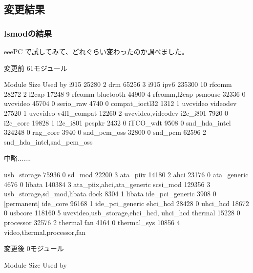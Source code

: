 \documentclass[mingoth,a4paper]{jsarticle}
\begin{document}
\subsection{変更結果}

\subsubsection{lsmodの結果}

eeePC で試してみて、どれぐらい変わったのか調べました。
\begin{multicols}{2}
 変更前 61モジュール
\begin{commandline}
Module                  Size  Used by
i915                   25280  2   
drm                    65256  3 i915
ipv6                  235300  10  
rfcomm                 28272  2   
l2cap                  17248  9 rfcomm
bluetooth              44900  4 rfcomm,l2cap
psmouse                32336  0   
uvcvideo               45704  0   
serio_raw               4740  0   
compat_ioctl32          1312  1 uvcvideo
videodev               27520  1 uvcvideo
v4l1_compat            12260  2 uvcvideo,videodev
i2c_i801                7920  0   
i2c_core               19828  1 i2c_i801
pcspkr                  2432  0   
iTCO_wdt                9508  0   
snd_hda_intel         324248  0   
rng_core                3940  0   
snd_pcm_oss            32800  0   
snd_pcm                62596  2 snd_hda_intel,snd_pcm_oss

中略.......

usb_storage            75936  0
sd_mod                 22200  3
ata_piix               14180  2
ahci                   23176  0
ata_generic             4676  0
libata                140384  3 ata_piix,ahci,ata_generic
scsi_mod              129356  3 usb_storage,sd_mod,libata
dock                    8304  1 libata
ide_pci_generic         3908  0 [permanent]
ide_core               96168  1 ide_pci_generic
ehci_hcd               28428  0
uhci_hcd               18672  0
usbcore               118160  5 uvcvideo,usb_storage,ehci_hcd,
uhci_hcd
thermal                15228  0
processor              32576  2 thermal
fan                     4164  0
thermal_sys            10856  4 video,thermal,processor,fan
\end{commandline}

 変更後 0モジュール
\begin{commandline}
Module                  Size  Used by
\end{commandline}
 
\end{multicols}
\end{document}
